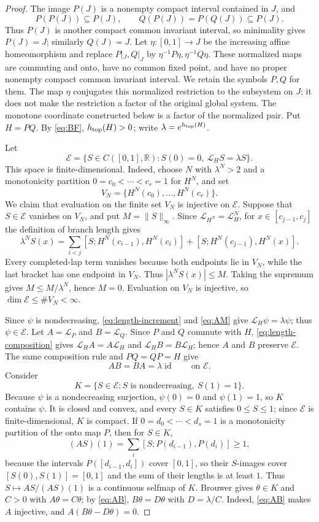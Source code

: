 \documentclass[11pt]{article}
\newcommand{\I}{[0,1]}
\newcommand{\id}{\operatorname{id}}
\begin{document}
\begin{proof}
The image $P(J)$ is a nonempty compact interval contained in $J$, and
\[
P(P(J))\subseteq P(J),\qquad Q(P(J))=P(Q(J))\subseteq P(J).
\]
Thus $P(J)$ is another compact common invariant interval, so minimality gives $P(J)=J$; similarly
$Q(J)=J$. Let $\eta:\I\to J$ be the increasing affine homeomorphism and replace
$P|_J,Q|_J$ by $\eta^{-1}P\eta,\eta^{-1}Q\eta$. These normalized maps are commuting and onto,
have no common fixed point, and have no proper nonempty compact common invariant interval. We retain
the symbols $P,Q$ for them. The map $\eta$ conjugates this normalized restriction to the subsystem
on $J$; it does not make the restriction a factor of the original global system. The monotone
coordinate constructed below is a factor of the normalized pair. Put $H=PQ$. By \eqref{eq:BF},
$h_{\rm top}(H)>0$; write $\lambda=e^{h_{\rm top}(H)}$.

Let
\[
\mathscr E=\{S\in C(\I,\mathbb R):S(0)=0,\ \mathcal L_HS=\lambda S\}.
\]
This space is finite-dimensional. Indeed, choose $N$ with $\lambda^N>2$ and a monotonicity partition
$0=c_0<\cdots<c_r=1$ for $H^N$, and set
\[
V_N=\{H^N(c_0),\ldots,H^N(c_r)\}.
\]
We claim that evaluation on the finite set $V_N$ is injective on $\mathscr E$. Suppose that
$S\in\mathscr E$ vanishes on $V_N$, and put $M=\|S\|_\infty$. Since
$\mathcal L_{H^N}=\mathcal L_H^N$, for $x\in[c_{j-1},c_j]$ the definition of branch length gives
\[
\lambda^NS(x)
 =\sum_{i<j}[S;H^N(c_{i-1}),H^N(c_i)]
  +[S;H^N(c_{j-1}),H^N(x)].
\]
Every completed-lap term vanishes because both endpoints lie in $V_N$, while the last bracket has one
endpoint in $V_N$. Thus $|\lambda^NS(x)|\le M$.
Taking the supremum gives $M\le M/\lambda^N$, hence $M=0$. Evaluation on $V_N$ is injective, so
$\dim\mathscr E\le\#V_N<\infty$.

Since $\psi$ is nondecreasing, \eqref{eq:length-increment} and \eqref{eq:AM} give
$\mathcal L_H\psi=\lambda\psi$; thus $\psi\in\mathscr E$. Let $A=\mathcal L_P$ and
$B=\mathcal L_Q$. Since $P$ and $Q$ commute with $H$, \eqref{eq:length-composition} gives
$\mathcal L_HA=A\mathcal L_H$ and $\mathcal L_HB=B\mathcal L_H$; hence $A$ and $B$ preserve
$\mathscr E$. The same composition rule and $PQ=QP=H$ give
\begin{equation}\label{eq:AB}
AB=BA=\lambda\id\qquad\text{on }\mathscr E.
\end{equation}
Consider
\[
K=\{S\in\mathscr E:S\text{ is nondecreasing},\ S(1)=1\}.
\]
Because $\psi$ is a nondecreasing surjection, $\psi(0)=0$ and $\psi(1)=1$, so $K$ contains $\psi$. It is closed and convex, and every $S\in K$ satisfies $0\le S\le1$; since
$\mathscr E$ is finite-dimensional, $K$ is compact. If $0=d_0<\cdots<d_s=1$ is a monotonicity partition of the onto map $P$, then
for $S\in K$,
\[
(AS)(1)=\sum_i[S;P(d_{i-1}),P(d_i)]\ge1,
\]
because the intervals $P([d_{i-1},d_i])$ cover $\I$, so their $S$-images cover $[S(0),S(1)]=[0,1]$ and the sum of their lengths is at least $1$. Thus $S\mapsto AS/(AS)(1)$ is a continuous
selfmap of $K$. Brouwer gives $\theta\in K$ and $C>0$ with $A\theta=C\theta$; by
\eqref{eq:AB}, $B\theta=D\theta$ with $D=\lambda/C$. Indeed, \eqref{eq:AB} makes $A$ injective,
and $A(B\theta-D\theta)=0$.


\end{proof}
\end{document}
